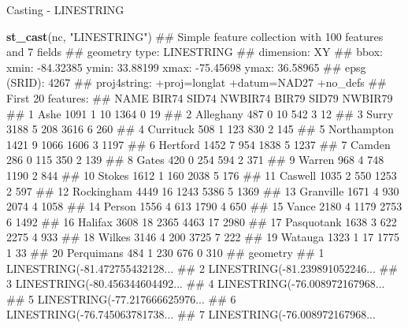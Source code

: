 \documentclass[11pt,ignorenonframetext,]{beamer}
\newenvironment{Shaded}{}{}
\newcommand{\KeywordTok}[1]{\textcolor[rgb]{0.00,0.44,0.13}{\textbf{#1}}}
\newcommand{\StringTok}[1]{\textcolor[rgb]{0.25,0.44,0.63}{#1}}
\newcommand{\NormalTok}[1]{#1}
\let\oldShaded\Shaded
\let\endoldShaded\endShaded
\renewenvironment{Shaded}{\footnotesize\begin{spacing}{0.9}\oldShaded}{\endoldShaded\end{spacing}}
\let\oldverbatim\verbatim
\let\endoldverbatim\endverbatim
\newcommand{\scriptoutput}{
  \renewenvironment{Shaded}{\scriptsize\begin{spacing}{0.9}\oldShaded}{\endoldShaded\end{spacing}}
  \renewenvironment{verbatim}{\scriptsize\begin{spacing}{0.9}\oldverbatim}{\endoldverbatim\end{spacing}}
}
\begin{document}
\begin{frame}[fragile,t]{Casting - LINESTRING}

\scriptoutput

\begin{Shaded}
\begin{Highlighting}[]
\KeywordTok{st_cast}\NormalTok{(nc, }\StringTok{"LINESTRING"}\NormalTok{)}
\NormalTok{## Simple feature collection with 100 features and 7 fields}
\NormalTok{## geometry type:  LINESTRING}
\NormalTok{## dimension:      XY}
\NormalTok{## bbox:           xmin: -84.32385 ymin: 33.88199 xmax: -75.45698 ymax: 36.58965}
\NormalTok{## epsg (SRID):    4267}
\NormalTok{## proj4string:    +proj=longlat +datum=NAD27 +no_defs}
\NormalTok{## First 20 features:}
\NormalTok{##           NAME BIR74 SID74 NWBIR74 BIR79 SID79 NWBIR79}
\NormalTok{## 1         Ashe  1091     1      10  1364     0      19}
\NormalTok{## 2    Alleghany   487     0      10   542     3      12}
\NormalTok{## 3        Surry  3188     5     208  3616     6     260}
\NormalTok{## 4    Currituck   508     1     123   830     2     145}
\NormalTok{## 5  Northampton  1421     9    1066  1606     3    1197}
\NormalTok{## 6     Hertford  1452     7     954  1838     5    1237}
\NormalTok{## 7       Camden   286     0     115   350     2     139}
\NormalTok{## 8        Gates   420     0     254   594     2     371}
\NormalTok{## 9       Warren   968     4     748  1190     2     844}
\NormalTok{## 10      Stokes  1612     1     160  2038     5     176}
\NormalTok{## 11     Caswell  1035     2     550  1253     2     597}
\NormalTok{## 12  Rockingham  4449    16    1243  5386     5    1369}
\NormalTok{## 13   Granville  1671     4     930  2074     4    1058}
\NormalTok{## 14      Person  1556     4     613  1790     4     650}
\NormalTok{## 15       Vance  2180     4    1179  2753     6    1492}
\NormalTok{## 16     Halifax  3608    18    2365  4463    17    2980}
\NormalTok{## 17  Pasquotank  1638     3     622  2275     4     933}
\NormalTok{## 18      Wilkes  3146     4     200  3725     7     222}
\NormalTok{## 19     Watauga  1323     1      17  1775     1      33}
\NormalTok{## 20  Perquimans   484     1     230   676     0     310}
\NormalTok{##                          geometry}
\NormalTok{## 1  LINESTRING(-81.472755432128...}
\NormalTok{## 2  LINESTRING(-81.239891052246...}
\NormalTok{## 3  LINESTRING(-80.456344604492...}
\NormalTok{## 4  LINESTRING(-76.008972167968...}
\NormalTok{## 5  LINESTRING(-77.217666625976...}
\NormalTok{## 6  LINESTRING(-76.745063781738...}
\NormalTok{## 7  LINESTRING(-76.008972167968...}

\end{Highlighting}
\end{Shaded}
\end{frame}
\end{document}
